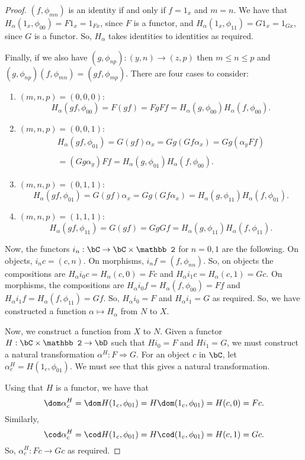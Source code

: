 \documentclass[main.tex]{subfiles}
\begin{document}
\begin{proof}
	$(f,\phi_{mn})$ is an identity if and only if $f=1_x$ and $m=n$. We have
	that $H_\alpha(1_x,\phi_{00})=F1_x=1_{Fx}$, since $F$ is a functor, and
	$H_\alpha(1_x,\phi_{11})=G1_x=1_{Gx}$, since $G$ is a functor. So,
	$H_\alpha$ takes identities to identities as required.

	Finally, if we also have $(g,\phi_{np}):(y,n)\rightarrow (z,p)$ then $m\le
	n\le p$ and $(g,\phi_{np})(f,\phi_{mn})=(gf,\phi_{mp})$. There are four
	cases to consider:
	\begin{enumerate}
		\item $(m,n,p)=(0,0,0)$:
			\[H_\alpha(gf,\phi_{00})=F(gf)=FgFf=H_\alpha(g,\phi_{00})H_\alpha(f,\phi_{00}).\]
		\item $(m,n,p)=(0,0,1)$:
			\[\begin{array}{l}H_\alpha(gf,\phi_{01})=G(gf)\alpha_x=Gg(Gf\alpha_x)=Gg(\alpha_yFf)\\ \\
					=(Gg\alpha_y)Ff=H_\alpha(g,\phi_{01})H_\alpha(f,\phi_{00}).
			\end{array}\]
		\item $(m,n,p)=(0,1,1)$:
			\[H_\alpha(gf,\phi_{01})=G(gf)\alpha_x=Gg(Gf\alpha_x)=H_\alpha(g,\phi_{11})H_\alpha(f,\phi_{01}).\]
		\item $(m,n,p)=(1,1,1)$:
			\[H_\alpha(gf,\phi_{11})=G(gf)=GgGf=H_\alpha(g,\phi_{11})H_\alpha(f,\phi_{11}).\]
	\end{enumerate}

	Now, the functors $i_n:\bC\rightarrow\bC\times\mathbb 2$ for $n=0,1$ are the
	following. On objects, $i_nc=(c,n)$. On morphisms, $i_nf=(f,\phi_{nn})$. So,
	on objects the compositions are $H_\alpha i_0c=H_\alpha (c,0)=Fc$ and
	$H_\alpha i_1c=H_\alpha (c,1)=Gc$. On morphisms, the compositions are
	$H_\alpha i_0f=H_\alpha (f,\phi_{00})=Ff$ and $H_\alpha i_1f=H_\alpha
	(f,\phi_{11})=Gf$. So, $H_\alpha i_0=F$ and $H_\alpha i_1=G$ as required.
	So, we have constructed a function $\alpha\mapsto H_\alpha$ from $N$ to $X$.

	Now, we construct a function from $X$ to $N$. Given a functor
	$H:\bC\times\mathbb 2\rightarrow\bD$ such that $Hi_0=F$ and $Hi_1=G$, we
	must construct a natural transformation $\alpha^H:F\Rightarrow G$. For an
	object $c$ in $\bC$, let $\alpha^H_c=H(1_c,\phi_{01})$. We must see that
	this gives a natural transformation.

	Using that $H$ is a functor, we have that
	\[\dom\alpha^H_c=\dom H(1_c,\phi_{01})=H\dom(1_c,\phi_{01})=H(c,0)=Fc.\]
	Similarly,
	\[\cod\alpha^H_c=\cod H(1_c,\phi_{01})=H\cod(1_c,\phi_{01})=H(c,1)=Gc.\]
	So, $\alpha^H_c:Fc\rightarrow Gc$ as required.


\end{proof}
\end{document}
